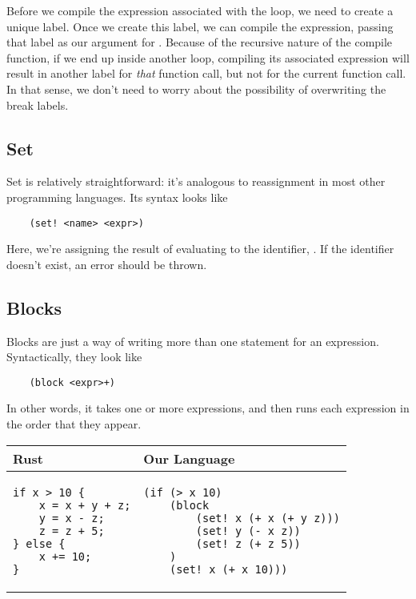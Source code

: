 \documentclass[letterpaper]{article}
\begin{document}
\bigskip 

Before we compile the expression associated with the loop, we need to create a unique label. Once we create this label, we can compile the expression, passing that label as our argument for . Because of the recursive nature of the compile function, if we end up inside another loop, compiling its associated expression will result in another label for \emph{that} function call, but not for the current function call. In that sense, we don't need to worry about the possibility of overwriting the break labels.

\subsection{Set}
Set is relatively straightforward: it's analogous to reassignment in most other programming languages. Its syntax looks like 
\begin{verbatim}
    (set! <name> <expr>)\end{verbatim}
Here, we're assigning the result of evaluating  to the identifier, . If the identifier doesn't exist, an error should be thrown. 

\subsection{Blocks}
Blocks are just a way of writing more than one statement for an expression. Syntactically, they look like 
\begin{verbatim}
    (block <expr>+)\end{verbatim}
In other words, it takes one or more expressions, and then runs each expression in the order that they appear.

\begin{center}
    \begin{tabular}{p{3in}|p{3in}}
        Rust & Our Language \\ 
        \hline 
        \begin{verbatim}
if x > 10 {
    x = x + y + z;
    y = x - z;
    z = z + 5;
} else {
    x += 10;
}\end{verbatim} 
            & \begin{verbatim}
(if (> x 10) 
    (block 
        (set! x (+ x (+ y z)))
        (set! y (- x z))
        (set! z (+ z 5))
    ) 
    (set! x (+ x 10)))\end{verbatim}
    \end{tabular}
\end{center}
\end{document}
